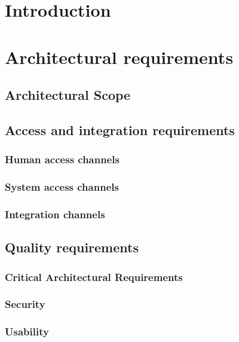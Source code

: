 \documentclass[a4paper,12pt,titlepage]{article}
\begin{document}


\tableofcontents
\newpage

\section{Introduction}

\section{Architectural requirements}
	\subsection{Architectural Scope} %
	
	\newpage
	
	\subsection{Access and integration requirements}
			\subsubsection{Human access channels}	
			\subsubsection{System access channels}	
			\subsubsection{Integration channels}
 	\subsection{Quality requirements}
 	
			\subsubsection{Critical Architectural Requirements}
		\subsubsection{Security}
			
		\subsubsection{Usability}
			
\end{document}
